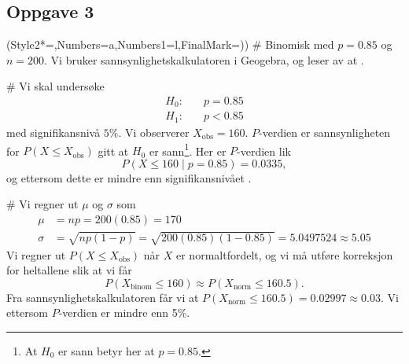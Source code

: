 \subsection*{Oppgave 3}
\begin{easylist}[enumerate]
	\ListProperties(Style2*=,Numbers=a,Numbers1=l,FinalMark={)})
	# Binomisk med $p = 0.85$ og $n = 200$.
	Vi bruker sannsynlighetskalkulatoren i Geogebra,
	og leser av at .
	
	# Vi skal undersøke
	\begin{align*}
		H_0 :  & \quad p = 0.85 \\
		H_1 :  & \quad p < 0.85 
	\end{align*}
	med signifikansnivå $5\%$. Vi observerer $X_\text{obs} = 160$.
	$P$-verdien er sannsynligheten for $P(X \leq X_\text{obs})$ gitt at $H_0$ er sann\footnote{At $H_0$ er sann betyr her at $p = 0.85$.}.
	Her er $P$-verdien lik 
	\begin{equation*}
		P(X \leq 160 \mid p = 0.85) = 0.0335,
	\end{equation*}
	og ettersom dette er mindre enn signifikansnivået .
	
	# Vi regner ut $\mu$ og $\sigma$ som
	\begin{align*}
		\mu &= np = 200 (0.85) = 170\\
		\sigma &= \sqrt{np(1-p)} = \sqrt{200 (0.85) (1 - 0.85)} = 5.0497524 \approx 5.05
	\end{align*}
	Vi regner ut $P(X \leq X_\text{obs})$ når $X$ er normaltfordelt, og vi må utføre korreksjon for heltallene slik at vi får
	\begin{equation*}
		P(X_\text{binom} \leq 160) \approx P(X_\text{norm} \leq 160.5).
	\end{equation*}
	Fra sannsynlighetskalkulatoren får vi at $P(X_\text{norm} \leq 160.5) = 0.02997 \approx 0.03$. 
	Vi  ettersom $P$-verdien er mindre enn 5\%.
\end{easylist}




